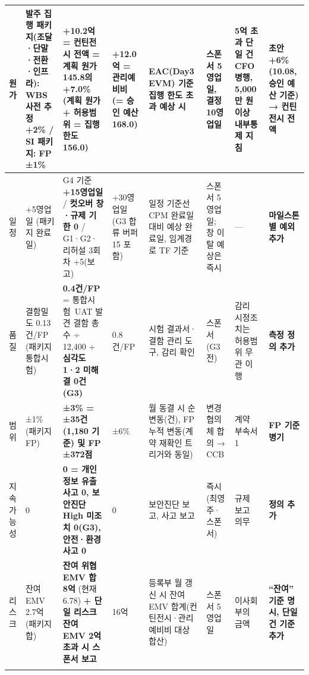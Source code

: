 \documentclass[10pt,a4paper]{article}
\begin{document}
{\begin{longtable}{|L{13mm}|L{34mm}|L{47mm}|L{27mm}|L{48mm}|L{24mm}|L{26mm}|L{26mm}|}
원가 & 발주 집행 패키지(조달·단말·전환·인프라): WBS 사전 추정 +2\% / SI 패키지: FP ±1\% & \textbf{+10.2억 = 컨틴전시 전액 = 계획 원가 145.8의 +7.0\%} (계획 원가 + 허용범위 = 집행 한도 156.0) & +12.0억 = 관리예비비 (= 승인 예산 168.0) & EAC(Day3 EVM) 기준 집행 한도 초과 \textbf{예상} 시 & 스폰서 5영업일, 결정 10영업일 & 5억 초과 단일 건 CFO 병행, 5,000만 원 이상 내부통제 지침 & \textbf{초안 +6\%(10.08, 승인 예산 기준) → 컨틴전시 전액} \\ \hline
일정 & +5영업일 (패키지 완료일) & G4 기준 \textbf{+15영업일} / \textbf{컷오버 창·규제 기한 0} / G1·G2·리허설 3회차 +5(보고) & +30영업일 (G3 합류 버퍼 15 포함) & 일정 기준선 CPM 완료일 대비 예상 완료일, 임계경로 TF 기준 & 스폰서 5영업일; 창 이탈 예상은 즉시 & — & \textbf{마일스톤별 예외 추가} \\ \hline
품질 & 결함밀도 0.13건/FP (패키지 통합시험) & \textbf{0.4건/FP} = 통합시험~UAT 발견 결함 총수 ÷ 12,400 + \textbf{심각도 1·2 미해결 0건(G3)} & 0.8건/FP & 시험 결과서·결함 관리 도구, 감리 확인 & 스폰서 (G3 전) & 감리 시정조치는 허용범위 무관 이행 & \textbf{측정 정의 추가} \\ \hline
범위 & ±1\% (패키지 FP) & \textbf{±3\% = ±35건(1,180 기준) 및 FP ±372점} & ±6\% & 월 동결 시 순변동(건), FP 누적 변동(계약 재확인 트리거와 동일) & 변경협의체 합의 → CCB & 계약 부속서 1 & \textbf{FP 기준 병기} \\ \hline
지속가능성 & 0 & \textbf{0 = 개인정보 유출 사고 0, 보안진단 High 미조치 0(G3), 안전·환경 사고 0} & 0 & 보안진단 보고, 사고 보고 & 즉시 (최영주·스폰서) & 규제 보고 의무 & \textbf{정의 추가} \\ \hline
리스크 & 잔여 EMV 2.7억 (패키지 합) & \textbf{잔여 위협 EMV 합 8억} (현재 6.78) \textbf{+ 단일 리스크 잔여 EMV 2억 초과 시 스폰서 보고} & 16억 & 등록부 월 갱신 시 잔여 EMV 합계(컨틴전시·관리예비비 대상 합산) & 스폰서 5영업일 & 이사회 부의 금액 & \textbf{“잔여” 기준 명시, 단일 건 기준 추가} \\ \hline
\fi
\end{longtable}}
\end{document}
